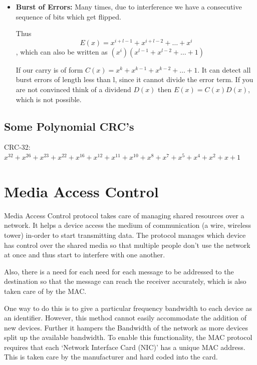 \documentclass[12pt]{article}
\newcommand{\tbox}[1]{\noindent\fbox{\parbox{\textwidth}{#1}}}
\begin{document}
\begin{itemize}
    \item \textbf{Burst of Errors:}
    Many times, due to interference we have a consecutive sequence of bits which get flipped. 

    Thus \[E(x) = x^{i + l -1} + x^{i + l -2} + \dots + x^i\], which can also be 
    written as \((x^i)(x^{l-1} + x^{l-2} + \dots+ 1)\)

    If our carry is of form \(C(x) = x^k + x^{k-1} + x^{k-2} + \dots + 1\). 
    It can detect all burst errors of length less than l, since it cannot divide the error term. 
    If you are not convinced think of a dividend \(D(x)\) then \(E(x) = C(x)D(x)\), which is not possible. 
\end{itemize}
\subsection{Some Polynomial CRC's}

CRC-32: \(x^{32} + x^{26} + x^{23} + x^{22} + x^{16} + x^{12} + x^{11} + x^{10} + x^{8} + x^{7} + x^{5} + x^{4} + x^{2} + x + 1 \)


\noindent\tbox{
    \begin{center}
    \textbf{\Huge Lecture 13}
    \end{center}
}
\section{Media Access Control}

Media Access Control protocol takes care of managing shared resources over a network. It helps 
a device access the medium of communication (a wire, wireless tower) in-order to start transmitting data. 
The protocol manages which device has control over the shared media so that multiple people don't use the network at once and thus 
start to interfere with one another. 

Also, there is a need for each need for each message to be addressed to the destination so that 
the message can reach the receiver accurately, which is also taken care of by the MAC.

One way to do this is to give a particular frequency bandwidth to each device as an identifier. 
However, this method cannot easily accommodate the addition of new devices. Further it hampers the Bandwidth of the network as more 
devices split up the available bandwidth.  
To enable this functionality, the MAC protocol requires that each `Network Interface Card (NIC)' has a
unique MAC address. This is taken care by the manufacturer and hard coded into the card. 
\end{document}
